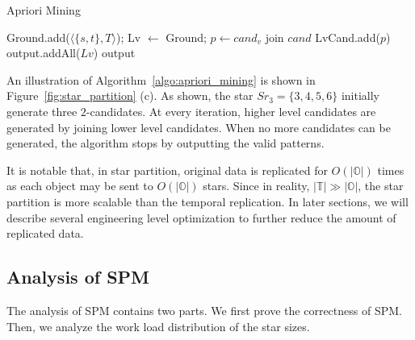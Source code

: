 \begin{algorithm}
\caption{Apriori Mining}
\label{algo:apriori_mining}
\begin{algorithmic}[1]
\State Ground.add($\langle \{s,t\}, T \rangle$);
\State Lv $\gets$ Ground;
\EndFor
{}
				\State $p \gets cand_v$ join $cand$
					\State LvCand.add($p$)
				\EndIf
			\EndFor
		\EndFor
		\EndIf
	\Else
	\EndIf
\EndWhile
\State output.addAll($Lv$)
\State \Return output
\end{algorithmic}
\end{algorithm}
 
An illustration of Algorithm~\ref{algo:apriori_mining} is shown in Figure~\ref{fig:star_partition} (c).
As shown, the star $Sr_3=\{3,4,5,6\}$ initially generate three $2$-candidates. At every iteration, 
higher level candidates are generated by joining lower level candidates. When no more candidates 
can be generated, the algorithm stops by outputting the valid patterns.

It is notable that, in star partition, original data is 
replicated for $O(|\mathbb{O}|)$ times as each object may 
be sent to $O(|\mathbb{O}|)$ stars. Since in reality, $|\mathbb{T}| \gg |\mathbb{O}|$, 
the star partition is more scalable than the temporal replication.
In later sections, we will describe several engineering level optimization to further reduce the amount of replicated data.

\subsection{Analysis of SPM}
The analysis of SPM contains two parts. We first prove the correctness
of SPM. Then, we analyze the work load distribution of the star sizes.

